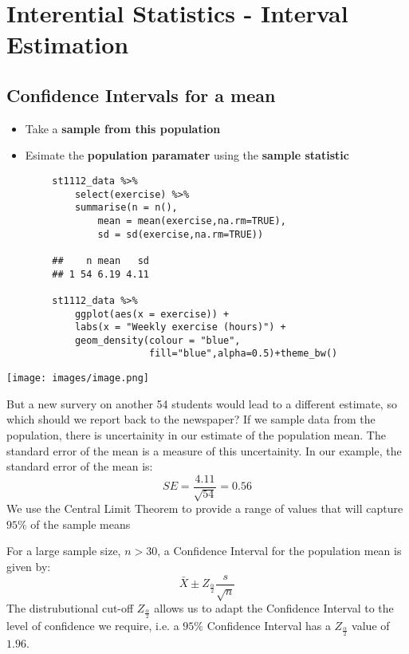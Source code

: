 \documentclass[a4paper, 10pt]{article}
\begin{document}
\pagebreak

\section{Interential Statistics - Interval Estimation}
\subsection{Confidence Intervals for a mean}
\begin{examplebox}
    \begin{itemize}
        \item Take a \textbf{sample from this population}
        \item Esimate the \textbf{population paramater} using the \textbf{sample statistic}
    \end{itemize}

    \begin{lstlisting}
        st1112_data %>% 
            select(exercise) %>% 
            summarise(n = n(),
                mean = mean(exercise,na.rm=TRUE),
                sd = sd(exercise,na.rm=TRUE))
        
        ##    n mean   sd
        ## 1 54 6.19 4.11

        st1112_data %>% 
            ggplot(aes(x = exercise)) + 
            labs(x = "Weekly exercise (hours)") +
            geom_density(colour = "blue", 
                         fill="blue",alpha=0.5)+theme_bw()
    \end{lstlisting}
    \begin{center}
        \texttt{[image: images/image.png]}
    \end{center}

    But a new survery on another 54 students would lead to a different estimate, so which should we report back to the newspaper?
    If we sample data from the population, there is uncertainity in our estimate of the population mean.
    The standard error of the mean is a measure of this uncertainity. In our example, the standard error of the mean is:
    $$SE = \frac{4.11}{\sqrt{54}} = 0.56$$
    We use the Central Limit  Theorem to provide a range of values that will capture $95\%$ of the sample means
\end{examplebox}

\begin{definitionbox}
    For a large sample size, $n > 30$, a Confidence Interval for the population mean is given by:
    $$\bar{X} \pm Z_{\frac{\alpha}{2}} \frac{s}{\sqrt{n}}$$
    The distrubutional cut-off $Z_{\frac{\alpha}{2}}$ allows us to adapt the Confidence Interval to the level of confidence we require, i.e. a $95\%$ Confidence Interval has a $Z_{\frac{\alpha}{2}}$ value of $1.96$.
\end{definitionbox}
\end{document}
